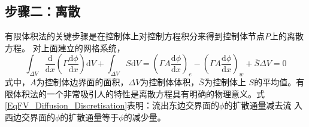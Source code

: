 \subsection{步骤二：离散}
有限体积法的关键步骤是在控制体上对控制方程积分来得到控制体节点$P$上的离散方程。
对上面建立的网格系统，
\begin{equation}
  \int_{\Delta V}\!
  \frac{\mathrm{d} }{\mathrm{d} x}
  \left(
    \Gamma \frac{\mathrm{d} \phi}{\mathrm{d} x}
  \right)
  \mathrm{d}V
  +
  \int_{\Delta V}\!
  S
  \mathrm{d}V
  =
  \left(
    \Gamma A\frac{\mathrm{d} \phi}{\mathrm{d} x}
  \right)_{e}
  -
  \left(
    \Gamma A\frac{\mathrm{d} \phi}{\mathrm{d} x}
  \right)_{w}
  +
  \overline{S}\Delta V
  =
  0
  \label{EqFV_Diffusion_Discretisation}
\end{equation}
式中，$A$为控制体边界面的面积，$\Delta V$为控制体体积，$\overline{S}$为控制体上
$S$的平均值。有限体积法的一个非常吸引人的特性是离散方程具有明确的物理意义。式
\eqref{EqFV_Diffusion_Discretisation}表明：流出东边交界面的$\phi$的扩散通量减去流
入西边交界面的$\phi$的扩散通量等于$\phi$的减少量。

